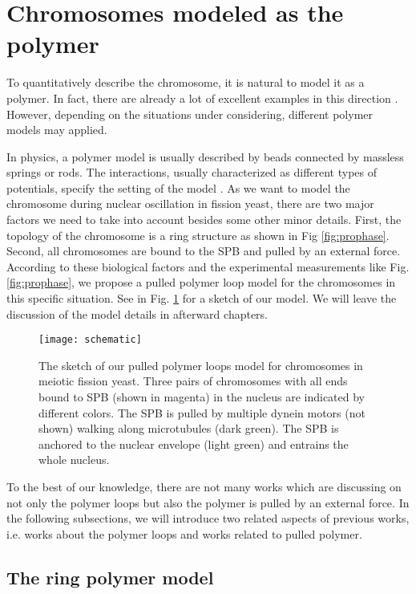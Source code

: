 \section{Chromosomes modeled as the polymer}
To quantitatively describe the chromosome, it is natural to model it as a polymer. In fact, there are already a lot of excellent examples in this direction \cite{Wong2013,Tree2013,Halverson2014,Jun2010a}. However, depending on the situations under considering, different polymer models may applied. 

In physics, a polymer model is usually described by beads connected by massless springs or rods. The interactions, usually characterized as different types of potentials, specify the setting of the model \cite{Doi1988}. As we want to model the chromosome during nuclear oscillation in fission yeast, there are two major factors we need to take into account besides some other minor details. First, the topology of the chromosome is a ring structure as shown in Fig \ref{fig:prophase}. Second, all chromosomes are bound to the SPB and pulled by an external force. According to these biological factors and the experimental measurements like Fig. \ref{fig:prophase}, we propose a pulled polymer loop model for the chromosomes in this specific situation. See in Fig. \ref{fig:schematic} for a sketch of our model. We will leave the discussion of the model details in afterward chapters.

\begin{figure}[htpb]
    \centering
    \texttt{[image: schematic]}
    \caption{The sketch of our pulled polymer loops model for chromosomes in meiotic fission yeast. Three pairs of chromosomes with all ends bound to SPB (shown in magenta) in the nucleus are indicated by different colors.  The SPB is pulled by multiple dynein motors (not shown) walking along microtubules (dark green). The SPB is anchored to the nuclear envelope (light green) and entrains the whole nucleus.}
    \label{fig:schematic}
\end{figure}

To the best of our knowledge, there are not many works which are discussing on not only the polymer loops but also the polymer is pulled by an external force. In the following subsections, we will introduce two related aspects of previous works, i.e. works about the polymer loops and works related to pulled polymer. 

\subsection{The ring polymer model}
\label{sub:the_ring_polymer_model}

